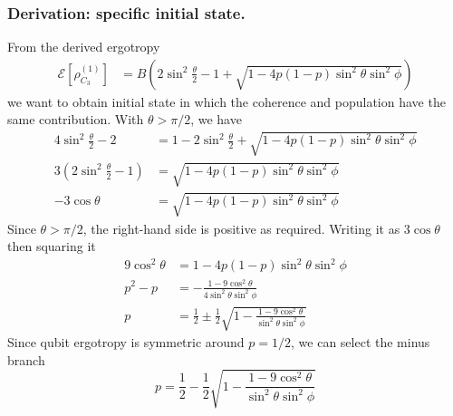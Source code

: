 \documentclass[../../../main.tex]{subfiles}
\begin{document}
\subsubsection{Derivation: specific initial state.}
From the derived ergotropy
\begin{align*}
  \mathcal{E} \left[ \rho^{(1)}_{C_3} \right]
   & = B \left( 2\sin^2 \frac{\theta }{2} - 1 + \sqrt{1 - 4p(1-p)\sin ^2\theta \sin^2 \phi}  \right)
\end{align*}
we want to obtain initial state in which the coherence and population have the same contribution.
With $\theta > \pi/2$, we have
\begin{align*}
  4 \sin^2 \frac{\theta }{2 }-2             & =   1 - 2 \sin ^2 \frac{\theta }{2} + \sqrt{1-4p(1-p)\sin ^2\theta \sin^2 \phi} \\
  3\left( 2\sin^2\frac{\theta}{2}-1 \right) & = \sqrt{1-4p(1-p)\sin^2\theta\sin^2\phi}                                        \\
  - 3\cos\theta                             & =
  \sqrt{1-4p(1-p)\sin^2\theta\sin^2\phi}
\end{align*}
Since \(\theta>\pi/2\), the right-hand side is positive as required.
Writing it as $3 \cos \theta$ then squaring it
\begin{align*}
  9\cos^2\theta & =
  1-4p(1-p)\sin^2\theta\sin^2\phi                                                                           \\
  p^2-p         & =
  - \frac{1-9\cos^2\theta}{4\sin^2\theta\sin^2\phi}                                                         \\
  p             & = \frac{1 }{2 }\pm \frac{1 }{2} \sqrt{1 - \frac{1-9\cos^2\theta}{\sin^2\theta\sin^2\phi}}
\end{align*}
Since qubit ergotropy is symmetric around $p=1/2$, we can select the minus branch
\begin{equation*}
  p  = \frac{1 }{2 } - \frac{1 }{2} \sqrt{1 - \frac{1-9\cos^2\theta}{\sin^2\theta\sin^2\phi}}
\end{equation*}
\end{document}
